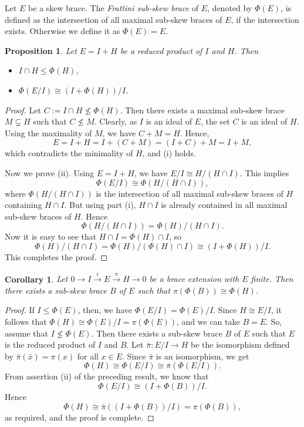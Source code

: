 \documentclass[11pt]{amsart}
\theoremstyle{thrm}
\theoremstyle{plain}
\newtheorem{prop}[thm]{Proposition}
\newtheorem{cor}[thm]{Corollary}
\theoremstyle{definition}
\numberwithin{equation}{section}
\begin{document}
Let $E$ be a skew brace. The \emph{Frattini sub-skew brace} of $E$, denoted by $\Phi(E)$, is defined as the intersection of all maximal sub-skew braces of $E$, if the intersection exists. Otherwise we define it as   $\Phi(E) = E$.


\begin{prop}\label{prop-reduced}
Let $E = I + H$ be a reduced  product of $I$ and $H$. Then
	\begin{itemize}
		\item[(i)] $I \cap H \leq \Phi(H)$,
		\item[(ii)] $\Phi(E/I) \cong (I + \Phi(H))/I$.
	\end{itemize}
\end{prop}
\begin{proof}
 Let \( C := I \cap H \not\leq \Phi(H) \). Then there exists a maximal sub-skew brace \( M \subsetneq H \) such that \( C \not\leq M \). Clearly, as \( I \) is an ideal of \( E \), the set \( C \) is an ideal of \( H \). Using the maximality of \( M \), we have \( C + M = H \). Hence,
\[
E = I + H = I + (C + M) = (I + C) + M = I + M,
\]
which contradicts the minimality of \( H \), and (i) holds.

Now we prove (ii). Using \( E = I + H \), we have $E/I \cong H / (H \cap I).$ This implies
\[
\Phi(E/I) \cong \Phi(H / (H \cap I)),
\]
where \( \Phi(H / (H \cap I)) \) is the intersection of all maximal sub-skew braces of \( H \) containing \( H \cap I \). But using part (i), \( H \cap I \) is already contained in all maximal sub-skew braces of \( H \). Hence
\[
\Phi(H / (H \cap I)) = \Phi(H) / (H \cap I).
\]
Now it is easy to see that \( H \cap I = \Phi(H) \cap I \), so
\[
\Phi(H) / (H \cap I) = \Phi(H) / (\Phi(H) \cap I) \cong (I + \Phi(H)) / I.
\]
This completes the proof.
\end{proof}

\begin{cor}
Let  $0 \longrightarrow I \xrightarrow{i} E \xrightarrow{\pi} H \longrightarrow 0$
be a brace extension with $E$ finite. Then there exists a sub-skew brace $B$ of $E$ such that $\pi(\Phi(B)) \cong \Phi(H)$.
\end{cor}

\begin{proof}
	If $I \leq \Phi(E)$, then, we have $\Phi(E/I) = \Phi(E)/I$. Since $H \cong E/I$, it follows that $\Phi(H) \cong \Phi(E)/I = \pi(\Phi(E))$, and we can take $B = E$. So, assume that $I \nleq \Phi(E)$. Then there exists a sub-skew brace $B$ of $E$ such that $E$ is the reduced product of $I$ and $B$.  Let $\bar{\pi} : E/I \rightarrow H$ be the isomorphism defined by $\bar{\pi}(\bar{x}) = \pi(x)$ for all $x \in E$. Since $\bar{\pi}$ is an isomorphism, we get
	\[
	\Phi(H) \cong \Phi(E/I) \cong \bar{\pi}(\Phi(E/I)).
	\]
	From assertion (ii) of the preceding result,  we know  that
	\[
	\Phi(E/I) \cong (I + \Phi(B)) / I.
	\]
Hence
	\[
	\Phi(H) \cong \bar{\pi}((I + \Phi(B))/I) = \pi(\Phi(B)),
	\]
	as required, and the proof is complete.
\end{proof}
\end{document}

